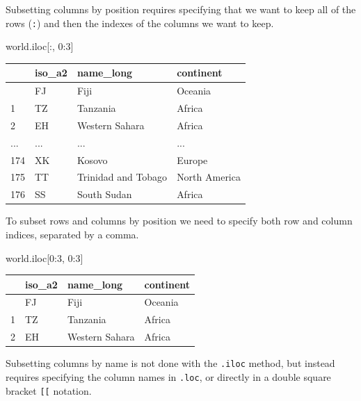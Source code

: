 \documentclass[
  letterpaper,
]{krantz}
\newenvironment{Shaded}{\begin{snugshade}}{\end{snugshade}}
\newcommand{\DecValTok}[1]{\textcolor[rgb]{0.68,0.00,0.00}{#1}}
\newcommand{\NormalTok}[1]{\textcolor[rgb]{0.00,0.23,0.31}{#1}}
\begin{document}
Subsetting columns by position requires specifying that we want to keep
all of the rows (\texttt{:}) and then the indexes of the columns we want
to keep.

\begin{Shaded}
\begin{Highlighting}[]
\NormalTok{world.iloc[:, }\DecValTok{0}\NormalTok{:}\DecValTok{3}\NormalTok{]}
\end{Highlighting}
\end{Shaded}

\begin{longtable}[]{@{}llll@{}}
\toprule\noalign{}
& iso\_a2 & name\_long & continent \\
\midrule\noalign{}
\endhead
\bottomrule\noalign{}
\endlastfoot
0 & FJ & Fiji & Oceania \\
1 & TZ & Tanzania & Africa \\
2 & EH & Western Sahara & Africa \\
... & ... & ... & ... \\
174 & XK & Kosovo & Europe \\
175 & TT & Trinidad and Tobago & North America \\
176 & SS & South Sudan & Africa \\
\end{longtable}

To subset rows and columns by position we need to specify both row and
column indices, separated by a comma.

\begin{Shaded}
\begin{Highlighting}[]
\NormalTok{world.iloc[}\DecValTok{0}\NormalTok{:}\DecValTok{3}\NormalTok{, }\DecValTok{0}\NormalTok{:}\DecValTok{3}\NormalTok{]}
\end{Highlighting}
\end{Shaded}

\begin{longtable}[]{@{}llll@{}}
\toprule\noalign{}
& iso\_a2 & name\_long & continent \\
\midrule\noalign{}
\endhead
\bottomrule\noalign{}
\endlastfoot
0 & FJ & Fiji & Oceania \\
1 & TZ & Tanzania & Africa \\
2 & EH & Western Sahara & Africa \\
\end{longtable}

Subsetting columns by name is not done with the \texttt{.iloc} method,
but instead requires specifying the column names in \texttt{.loc}, or
directly in a double square bracket \texttt{{[}{[}} notation.
\end{document}
